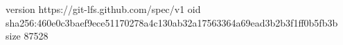 version https://git-lfs.github.com/spec/v1
oid sha256:460e0c3baef9ece51170278a4c130ab32a17563364a69ead3b2b3f1ff0b5fb3b
size 87528
